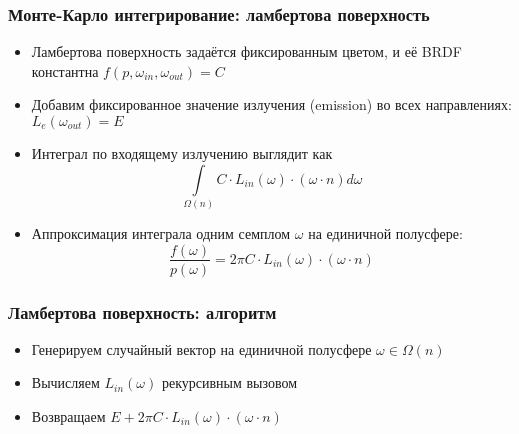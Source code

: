 \documentclass[handout,10pt]{beamer}
\begin{document}
\begin{frame}[fragile]
\frametitle{Монте-Карло интегрирование: ламбертова поверхность}
\begin{itemize}
\item Ламбертова поверхность задаётся фиксированным цветом, и её BRDF константна \begin{math}f(p, \omega_{in}, \omega_{out}) = C\end{math}
\pause
\item Добавим фиксированное значение излучения (emission) во всех направлениях: \begin{math}L_e(\omega_{out}) = E\end{math}
\pause
\item Интеграл по входящему излучению выглядит как
\begin{equation*}
\int\limits_{\Omega(n)} C\cdot L_{in}(\omega)\cdot (\omega \cdot n) d\omega
\end{equation*}
\pause
\item Аппроксимация интеграла одним семплом \begin{math}\omega\end{math} на единичной полусфере:
\begin{equation*}
\frac{f(\omega)}{p(\omega)} = 2\pi C \cdot L_{in}(\omega) \cdot (\omega \cdot n)
\end{equation*}
\end{itemize}
\end{frame}

\begin{frame}[fragile]
\frametitle{Ламбертова поверхность: алгоритм}
\begin{itemize}
\item Генерируем случайный вектор на единичной полусфере \begin{math}\omega \in \Omega(n)\end{math}
\pause
\item Вычисляем \begin{math}L_{in}(\omega)\end{math} рекурсивным вызовом
\pause
\item Возвращаем \begin{math}E + 2\pi C \cdot L_{in}(\omega) \cdot (\omega \cdot n)\end{math}
\end{itemize}
\end{frame}
\end{document}
